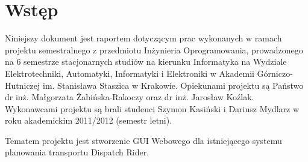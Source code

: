 \chapter{Wstęp}
Niniejszy dokument jest raportem dotyczącym prac wykonanych w ramach projektu semestralnego
z przedmiotu Inżynieria Oprogramowania, prowadzonego na 6 semestrze stacjonarnych
studiów na kierunku Informatyka na Wydziale Elektrotechniki, Automatyki, Informatyki i Elektroniki
w Akademii Górniczo-Hutniczej im. Stanisława Staszica w Krakowie. Opiekunami projektu są Państwo
dr inż. Małgorzata Żabińska-Rakoczy oraz dr inż. Jarosław Koźlak. Wykonawcami projektu są brali studenci
Szymon Kasiński i Dariusz Mydlarz w roku akademickim 2011/2012 (semestr letni).

Tematem projektu jest stworzenie GUI Webowego dla istniejącego systemu planowania transportu Dispatch Rider.